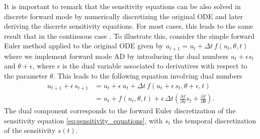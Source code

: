 It is important to remark that the sensitivity equations can be also solved in discrete forward mode by numerically discretizing the original ODE and later deriving the discrete sensitivity equations. 
For most cases, this leads to the same result that in the continuous case \cite{FATODE2014}.
To illustrate this, consider the simple forward Euler method applied to the original ODE given by $u_{t+1} = u_t + \Delta t \, f(u_t, \theta, t)$ where we implement forward mode AD by introducing the dual numbers $u_t + \epsilon s_t$ and $\theta + \epsilon$, where $\epsilon$ is the dual variable associated to derivatives with respect to the parameter $\theta$.
This leads to the following equation involving dual numbers
\begin{align}
    u_{t+1} + \epsilon \, s_{t+1}
    &= 
    u_t + \epsilon \, u_t + \Delta t \, f (u_t + \epsilon \, s_t, \theta + \epsilon, t) \nonumber \\
    &= 
    u_t + f(u_t, \theta, t) 
    + 
    \epsilon \, \Delta t 
    \left( 
    \frac{\partial f}{\partial u} s_t + 
    \frac{\partial f}{\partial \theta}
    \right).
\end{align}
The dual component corresponds to the forward Euler discretization of the sensitivity equation \eqref{eq:sensitivity_equations}, with $s_t$ the temporal discretization of the sensitivity $s(t)$.


